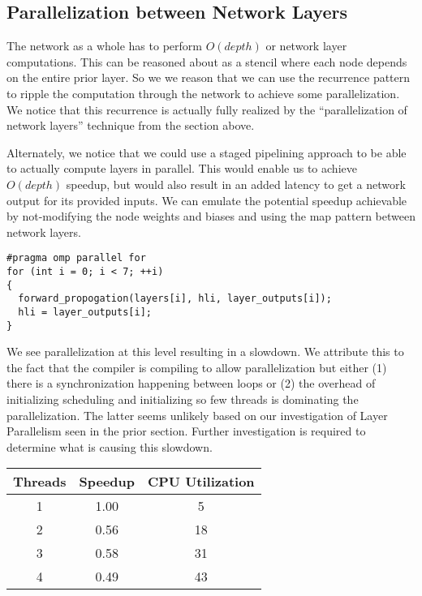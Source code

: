 \subsection*{Parallelization between Network Layers}
The network as a whole has to perform $O(depth)$ or \netdepth network layer computations.
This can be reasoned about as a stencil where each node depends on the entire prior layer.
So we we reason that we can use the recurrence pattern to ripple the computation through the network to achieve some parallelization.
We notice that this recurrence is actually fully realized by the ``parallelization of network layers'' technique from the section above.

Alternately, we notice that we could use a staged pipelining approach to be able to actually compute layers in parallel.
This would enable us to achieve $O(depth)$ speedup, but would also result in an added latency to get a network output for its provided inputs.
We can emulate the potential speedup achievable by not-modifying the node weights and biases and using the map pattern between network layers.

\begin{lstlisting}
#pragma omp parallel for
for (int i = 0; i < 7; ++i)
{
  forward_propogation(layers[i], hli, layer_outputs[i]);
  hli = layer_outputs[i];
}
\end{lstlisting}

We see parallelization at this level resulting in a slowdown.
We attribute this to the fact that the compiler is compiling to allow parallelization but either (1) there is a synchronization happening between loops or (2) the overhead of initializing scheduling and initializing so few threads is dominating the parallelization.
The latter seems unlikely based on our investigation of Layer Parallelism seen in the prior section.
Further investigation is required to determine what is causing this slowdown.

\begin{center}
\begin{tabular}{|c|c|c|}
  \hline
  Threads & Speedup & CPU Utilization \\ \hline
  1 & 1.00 & 5 \\
  2 & 0.56 & 18 \\
  3 & 0.58 & 31 \\
  4 & 0.49 & 43 \\
  \hline
\end{tabular}
\end{center}


